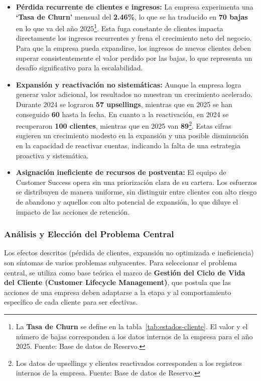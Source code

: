 \begin{itemize}
    \item \textbf{Pérdida recurrente de clientes e ingresos:} La empresa experimenta una \textbf{`Tasa de Churn'} mensual del \textbf{2.46\%}, lo que se ha traducido en \textbf{70 bajas} en lo que va del año 2025\footnote{La \textbf{Tasa de Churn} se define en la tabla~\ref{tab:estados-cliente}. El valor y el número de bajas corresponden a los datos internos de la empresa para el año 2025. Fuente: Base de datos de Reservo.}. Esta fuga constante de clientes impacta directamente los ingresos recurrentes y frena el crecimiento neto del negocio. Para que la empresa pueda expandirse, los ingresos de nuevos clientes deben superar consistentemente el valor perdido por las bajas, lo que representa un desafío significativo para la escalabilidad.

    \item \textbf{Expansión y reactivación no sistemáticas:} Aunque la empresa logra generar valor adicional, los resultados no muestran un crecimiento acelerado. Durante 2024 se lograron \textbf{57 upsellings}, mientras que en 2025 se han conseguido \textbf{60} hasta la fecha. En cuanto a la reactivación, en 2024 se recuperaron \textbf{100 clientes}, mientras que en 2025 van \textbf{89}\footnote{Los datos de upsellings y clientes reactivados corresponden a los registros internos de la empresa. Fuente: Base de datos de Reservo.}. Estas cifras sugieren un crecimiento modesto en la expansión y una posible disminución en la capacidad de reactivar cuentas, indicando la falta de una estrategia proactiva y sistemática.

    \item \textbf{Asignación ineficiente de recursos de postventa:} El equipo de Customer Success opera sin una priorización clara de su cartera. Los esfuerzos se distribuyen de manera uniforme, sin distinguir entre clientes con alto riesgo de abandono y aquellos con alto potencial de expansión, lo que diluye el impacto de las acciones de retención.
\end{itemize}

\subsubsection{Análisis y Elección del Problema Central}
Los efectos descritos (pérdida de clientes, expansión no optimizada e ineficiencia) son síntomas de varios problemas subyacentes. Para seleccionar el problema central, se utiliza como base teórica el marco de \textbf{Gestión del Ciclo de Vida del Cliente (Customer Lifecycle Management)}, que postula que las acciones de una empresa deben adaptarse a la etapa y al comportamiento específico de cada cliente para ser efectivas.

